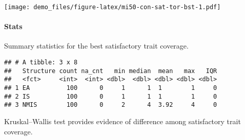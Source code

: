 \documentclass[]{book}
\newenvironment{Shaded}{\begin{snugshade}}{\end{snugshade}}
\newcommand{\CharTok}[1]{\textcolor[rgb]{0.31,0.60,0.02}{#1}}
\newcommand{\CommentTok}[1]{\textcolor[rgb]{0.56,0.35,0.01}{\textit{#1}}}
\newcommand{\DataTypeTok}[1]{\textcolor[rgb]{0.13,0.29,0.53}{#1}}
\newcommand{\KeywordTok}[1]{\textcolor[rgb]{0.13,0.29,0.53}{\textbf{#1}}}
\newcommand{\NormalTok}[1]{#1}
\newcommand{\OperatorTok}[1]{\textcolor[rgb]{0.81,0.36,0.00}{\textbf{#1}}}
\newcommand{\OtherTok}[1]{\textcolor[rgb]{0.56,0.35,0.01}{#1}}
\newcommand{\StringTok}[1]{\textcolor[rgb]{0.31,0.60,0.02}{#1}}
\let\oldparagraph\paragraph
\renewcommand{\paragraph}[1]{\oldparagraph{#1}\mbox{}}
\begin{document}
\texttt{[image: demo\_files/figure-latex/mi50-con-sat-tor-bst-1.pdf]}

\hypertarget{stats-39}{%
\paragraph{Stats}\label{stats-39}}

Summary statistics for the best satisfactory trait coverage.

\begin{Shaded}
\end{Shaded}

\begin{verbatim}
## # A tibble: 3 x 8
##   Structure count na_cnt   min median  mean   max   IQR
##   <fct>     <int>  <int> <dbl>  <dbl> <dbl> <dbl> <dbl>
## 1 EA          100      0     1      1  1        1     0
## 2 IS          100      0     1      1  1        1     0
## 3 NMIS        100      0     2      4  3.92     4     0
\end{verbatim}

Kruskal--Wallis test provides evidence of difference among satisfactory trait coverage.
\end{document}
